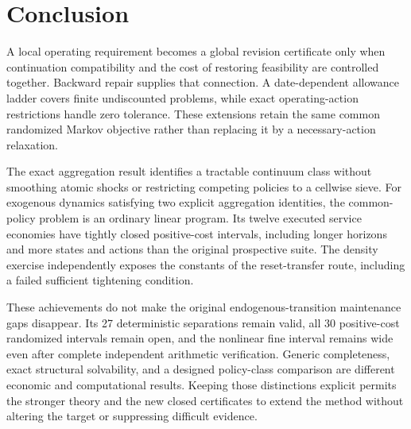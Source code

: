 

\section{Conclusion}\label{sec:conclusion}
A local operating requirement becomes a global revision certificate only when continuation compatibility and the cost of restoring feasibility are controlled together. Backward repair supplies that connection. A date-dependent allowance ladder covers finite undiscounted problems, while exact operating-action restrictions handle zero tolerance. These extensions retain the same common randomized Markov objective rather than replacing it by a necessary-action relaxation.

The exact aggregation result identifies a tractable continuum class without smoothing atomic shocks or restricting competing policies to a cellwise sieve. For exogenous dynamics satisfying two explicit aggregation identities, the common-policy problem is an ordinary linear program. Its twelve executed service economies have tightly closed positive-cost intervals, including longer horizons and more states and actions than the original prospective suite. The density exercise independently exposes the constants of the reset-transfer route, including a failed sufficient tightening condition.

These achievements do not make the original endogenous-transition maintenance gaps disappear. Its 27 deterministic separations remain valid, all 30 positive-cost randomized intervals remain open, and the nonlinear fine interval remains wide even after complete independent arithmetic verification. Generic completeness, exact structural solvability, and a designed policy-class comparison are different economic and computational results. Keeping those distinctions explicit permits the stronger theory and the new closed certificates to extend the method without altering the target or suppressing difficult evidence.



